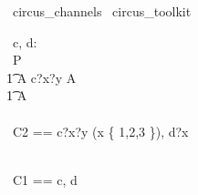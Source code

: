 

\begin{zsection}
  \SECTION\ circus\_channels \parents\ circus\_toolkit
\end{zsection}


\begin{circus}
	\circchannel\ c, d: \nat \cross \nat
	\\
	\circprocess\ P \circdef \circbegin \\
		\t1 A \circdef c?x?y \then A \\ 
		\t1 \circspot A \\
	\circend 
	\\
	\circchannelset\ C2 == \lchanset c?x?y \prefixcolon (x \in \{ 1,2,3 \}), d?x \rchanset

	\\
	\circchannelset\ C1 == \lchanset c, d \rchanset
	
\end{circus}